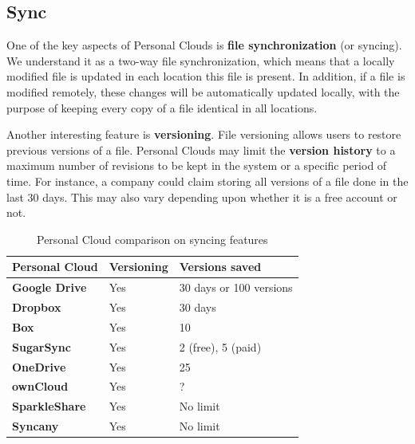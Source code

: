 \subsection{Sync}
One of the key aspects of Personal Clouds is \textbf{file synchronization} (or syncing). We understand it as a two-way file synchronization, which means that a locally modified file is updated in each location this file is present. In addition, if a file is modified remotely, these changes will be automatically updated locally, with the purpose of keeping every copy of a file identical in all locations.

Another interesting feature is \textbf{versioning}. File versioning allows users to restore previous versions of a file. Personal Clouds may limit the \textbf{version history} to a maximum number of revisions to be kept in the system or a specific period of time. For instance, a company could claim storing all versions of a file done in the last 30 days. This may also vary depending upon whether it is a free account or not.


{
\def\arraystretch{1.5}

\begin{table}
\begin{center}
    \begin{tabular}{ | p{3.3cm} | p{2cm} | p{2.9cm} | }
    \hline
    \rowcolor[gray]{0.8}

	\textbf{Personal Cloud} &
	\textbf{Versioning} & 
	\textbf{Versions saved} \\ \hline

	\textbf{Google Drive} &
	Yes &
	30 days or 100 versions \\ \hline

	\textbf{Dropbox} &
	Yes &
	30 days \\ \hline
	
	\textbf{Box} &
	Yes &
	10 \\ \hline
	
	\textbf{SugarSync} & 
	Yes &
	2 (free), 5 (paid) \\ \hline
	
	\textbf{OneDrive} & 
	Yes &
	25 \\ \hline
	
	\textbf{ownCloud} &
	Yes &
	? \\ \hline
	
	\textbf{SparkleShare} &
	Yes &
	No limit \\ \hline
	
	\textbf{Syncany} &
	Yes &
	No limit \\ \hline

    \end{tabular}
    \caption{Personal Cloud comparison on syncing features}
    \label{tab:pc_syncing}
\end{center}
\end{table}
}

